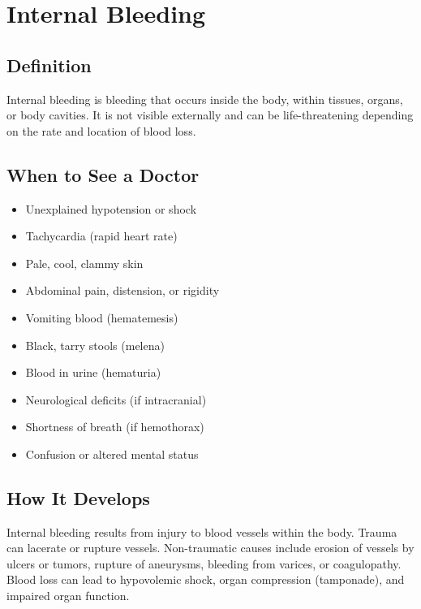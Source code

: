 \chapter{Internal Bleeding}

\section*{Definition}
Internal bleeding is bleeding that occurs inside the body, within tissues, organs, or body cavities. It is not visible externally and can be life-threatening depending on the rate and location of blood loss.

\section*{When to See a Doctor}
\begin{itemize}
\item Unexplained hypotension or shock
\item Tachycardia (rapid heart rate)
\item Pale, cool, clammy skin
\item Abdominal pain, distension, or rigidity
\item Vomiting blood (hematemesis)
\item Black, tarry stools (melena)
\item Blood in urine (hematuria)
\item Neurological deficits (if intracranial)
\item Shortness of breath (if hemothorax)
\item Confusion or altered mental status
\end{itemize}

\section*{How It Develops}
Internal bleeding results from injury to blood vessels within the body. Trauma can lacerate or rupture vessels. Non-traumatic causes include erosion of vessels by ulcers or tumors, rupture of aneurysms, bleeding from varices, or coagulopathy. Blood loss can lead to hypovolemic shock, organ compression (tamponade), and impaired organ function.

